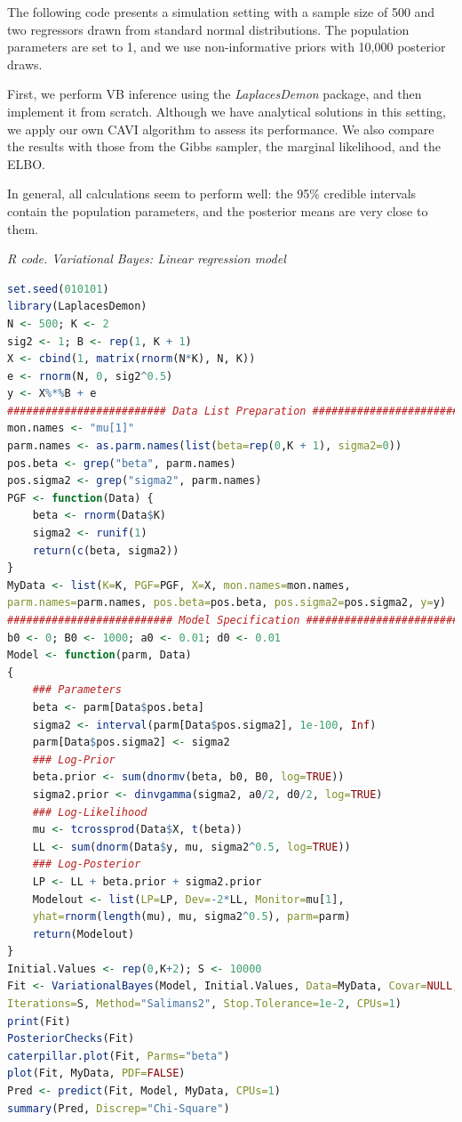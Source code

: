 The following code presents a simulation setting with a sample size of 500 and two regressors drawn from standard normal distributions. The population parameters are set to 1, and we use non-informative priors with 10,000 posterior draws.

First, we perform VB inference using the \textit{LaplacesDemon} package, and then implement it from scratch. Although we have analytical solutions in this setting, we apply our own CAVI algorithm to assess its performance. We also compare the results with those from the Gibbs sampler, the marginal likelihood, and the ELBO.

In general, all calculations seem to perform well: the 95\% credible intervals contain the population parameters, and the posterior means are very close to them.
 
\begin{tcolorbox}[enhanced,width=4.67in,center upper,
	fontupper=\large\bfseries,drop shadow southwest,sharp corners]
	\textit{R code. Variational Bayes: Linear regression model}
	\begin{VF}
		\begin{lstlisting}[language=R]
set.seed(010101)
library(LaplacesDemon)
N <- 500; K <- 2
sig2 <- 1; B <- rep(1, K + 1)
X <- cbind(1, matrix(rnorm(N*K), N, K))
e <- rnorm(N, 0, sig2^0.5)
y <- X%*%B + e
######################### Data List Preparation #########################
mon.names <- "mu[1]"
parm.names <- as.parm.names(list(beta=rep(0,K + 1), sigma2=0))
pos.beta <- grep("beta", parm.names)
pos.sigma2 <- grep("sigma2", parm.names)
PGF <- function(Data) {
	beta <- rnorm(Data$K)
	sigma2 <- runif(1)
	return(c(beta, sigma2))
}
MyData <- list(K=K, PGF=PGF, X=X, mon.names=mon.names,
parm.names=parm.names, pos.beta=pos.beta, pos.sigma2=pos.sigma2, y=y)
########################## Model Specification ##########################
b0 <- 0; B0 <- 1000; a0 <- 0.01; d0 <- 0.01
Model <- function(parm, Data)
{
	### Parameters
	beta <- parm[Data$pos.beta]
	sigma2 <- interval(parm[Data$pos.sigma2], 1e-100, Inf)
	parm[Data$pos.sigma2] <- sigma2
	### Log-Prior
	beta.prior <- sum(dnormv(beta, b0, B0, log=TRUE))
	sigma2.prior <- dinvgamma(sigma2, a0/2, d0/2, log=TRUE)
	### Log-Likelihood
	mu <- tcrossprod(Data$X, t(beta))
	LL <- sum(dnorm(Data$y, mu, sigma2^0.5, log=TRUE))
	### Log-Posterior
	LP <- LL + beta.prior + sigma2.prior
	Modelout <- list(LP=LP, Dev=-2*LL, Monitor=mu[1],
	yhat=rnorm(length(mu), mu, sigma2^0.5), parm=parm)
	return(Modelout)
}
Initial.Values <- rep(0,K+2); S <- 10000
Fit <- VariationalBayes(Model, Initial.Values, Data=MyData, Covar=NULL, 
Iterations=S, Method="Salimans2", Stop.Tolerance=1e-2, CPUs=1)
print(Fit)
PosteriorChecks(Fit)
caterpillar.plot(Fit, Parms="beta")
plot(Fit, MyData, PDF=FALSE)
Pred <- predict(Fit, Model, MyData, CPUs=1)
summary(Pred, Discrep="Chi-Square")
\end{lstlisting}
	\end{VF}
\end{tcolorbox}

